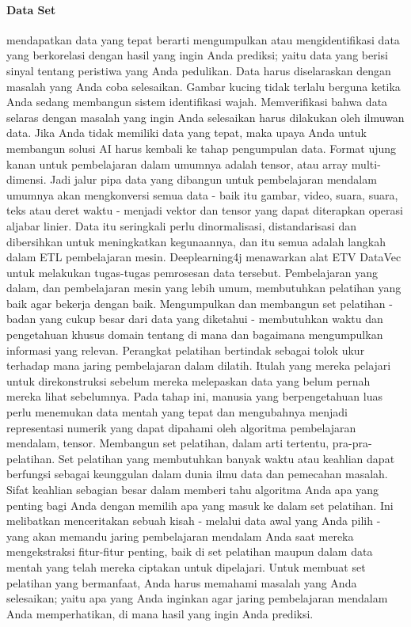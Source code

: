 \paragraph{Data Set}\hspace{0pt} \par
mendapatkan data yang tepat berarti mengumpulkan atau mengidentifikasi data yang berkorelasi dengan hasil yang ingin Anda prediksi; yaitu data yang berisi sinyal tentang peristiwa yang Anda pedulikan. Data harus diselaraskan dengan masalah yang Anda coba selesaikan. Gambar kucing tidak terlalu berguna ketika Anda sedang membangun sistem identifikasi wajah. Memverifikasi bahwa data selaras dengan masalah yang ingin Anda selesaikan harus dilakukan oleh ilmuwan data. Jika Anda tidak memiliki data yang tepat, maka upaya Anda untuk membangun solusi AI harus kembali ke tahap pengumpulan data.
Format ujung kanan untuk pembelajaran dalam umumnya adalah tensor, atau array multi-dimensi. Jadi jalur pipa data yang dibangun untuk pembelajaran mendalam umumnya akan mengkonversi semua data - baik itu gambar, video, suara, suara, teks atau deret waktu - menjadi vektor dan tensor yang dapat diterapkan operasi aljabar linier. Data itu seringkali perlu dinormalisasi, distandarisasi dan dibersihkan untuk meningkatkan kegunaannya, dan itu semua adalah langkah dalam ETL pembelajaran mesin. Deeplearning4j menawarkan alat ETV DataVec untuk melakukan tugas-tugas pemrosesan data tersebut.
Pembelajaran yang dalam, dan pembelajaran mesin yang lebih umum, membutuhkan pelatihan yang baik agar bekerja dengan baik. Mengumpulkan dan membangun set pelatihan - badan yang cukup besar dari data yang diketahui - membutuhkan waktu dan pengetahuan khusus domain tentang di mana dan bagaimana mengumpulkan informasi yang relevan. Perangkat pelatihan bertindak sebagai tolok ukur terhadap mana jaring pembelajaran dalam dilatih. Itulah yang mereka pelajari untuk direkonstruksi sebelum mereka melepaskan data yang belum pernah mereka lihat sebelumnya.
Pada tahap ini, manusia yang berpengetahuan luas perlu menemukan data mentah yang tepat dan mengubahnya menjadi representasi numerik yang dapat dipahami oleh algoritma pembelajaran mendalam, tensor. Membangun set pelatihan, dalam arti tertentu, pra-pra-pelatihan.
Set pelatihan yang membutuhkan banyak waktu atau keahlian dapat berfungsi sebagai keunggulan dalam dunia ilmu data dan pemecahan masalah. Sifat keahlian sebagian besar dalam memberi tahu algoritma Anda apa yang penting bagi Anda dengan memilih apa yang masuk ke dalam set pelatihan.
Ini melibatkan menceritakan sebuah kisah - melalui data awal yang Anda pilih - yang akan memandu jaring pembelajaran mendalam Anda saat mereka mengekstraksi fitur-fitur penting, baik di set pelatihan maupun dalam data mentah yang telah mereka ciptakan untuk dipelajari.
Untuk membuat set pelatihan yang bermanfaat, Anda harus memahami masalah yang Anda selesaikan; yaitu apa yang Anda inginkan agar jaring pembelajaran mendalam Anda memperhatikan, di mana hasil yang ingin Anda prediksi.

